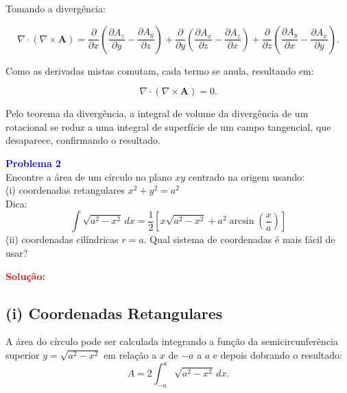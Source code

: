 \documentclass[a4paper,12pt]{article}
\begin{document}
Tomando a divergência:

\begin{equation}
    \nabla \cdot (\nabla \times \mathbf{A}) = \frac{\partial}{\partial x} \left( \frac{\partial A_z}{\partial y} - \frac{\partial A_y}{\partial z} \right) + 
    \frac{\partial}{\partial y} \left( \frac{\partial A_x}{\partial z} - \frac{\partial A_z}{\partial x} \right) + 
    \frac{\partial}{\partial z} \left( \frac{\partial A_y}{\partial x} - \frac{\partial A_x}{\partial y} \right).
\end{equation}

Como as derivadas mistas comutam, cada termo se anula, resultando em:

\begin{equation}
    \nabla \cdot (\nabla \times \mathbf{A}) = 0.
\end{equation}

Pelo teorema da divergência, a integral de volume da divergência de um rotacional se reduz a uma integral de superfície 
de um campo tangencial, que desaparece, confirmando o resultado.

\begin{flushleft}
\textbf{\textcolor{blue}{Problema 2}}\\
Encontre a área de um círculo no plano \(xy\) centrado na origem usando: \\ 
(i) coordenadas retangulares \(x^2 + y^2 = a^2 \) \\
Dica:
\begin{equation}
\int \sqrt{a^2 - x^2} \, dx = \frac{1}{2} \left[ x\sqrt{a^2 - x^2} + a^2 \arcsin\left(\frac{x}{a}\right) \right]
\end{equation}
(ii) coordenadas cilíndricas \(r = a\).  
Qual sistema de coordenadas é mais fácil de usar?
\end{flushleft}

\textcolor{red}{\textbf{Solução:}}\\

\subsection*{(i) Coordenadas Retangulares}
A área do círculo pode ser calculada integrando a função da semicircunferência superior $y = \sqrt{a^2 - x^2}$ em relação a $x$ de $-a$ a $a$ e depois dobrando o resultado:
\begin{equation}
A = 2 \int_{-a}^{a} \sqrt{a^2 - x^2} \, dx.
\end{equation}
\end{document}
